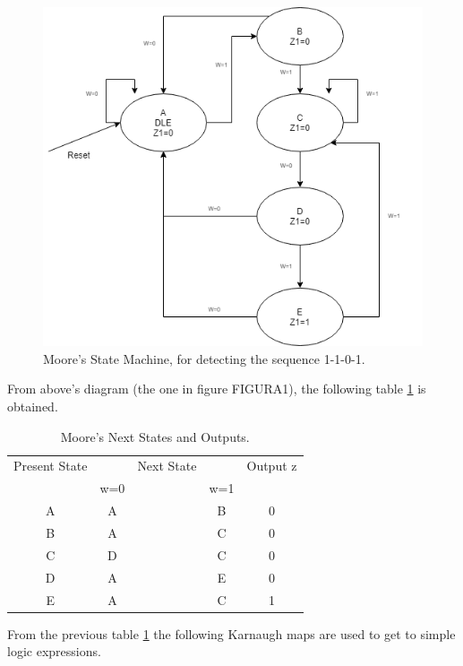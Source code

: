 \begin{figure}[H]
\centering
\includegraphics[scale=0.5]{../Exercise2/EJ2MOORE}
\caption{\color{cyan}Moore's State Machine, for detecting the sequence 1-1-0-1.}
\label{MOOREFSM}
\end{figure}

From above's diagram (the one in figure FIGURA1), the following table \ref {measej1} is obtained. 
\begin{table}[H]
\begin{center}
\begin{tabular}{|c|c c c|c|}
\hline
Present State & & Next State & & Output z \\
 & w=0 & & w=1 &   \\
\hline
\hline
A & A & & B & 0   \\
\hline
B & A & & C & 0   \\
\hline
C & D & & C & 0   \\
\hline
D & A & & E & 0   \\
\hline
E & A & & C & 1   \\
\hline
\hline
\end{tabular}
\end{center}
\caption{\label{measej1}\color{cyan}Moore's Next States and Outputs.}
\end{table}

From the previous table \ref {measej1} the following Karnaugh maps are used to get to simple logic expressions.


